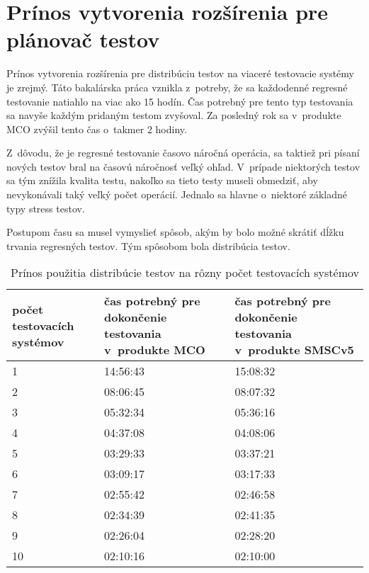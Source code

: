 \section{Prínos vytvorenia rozšírenia pre plánovač testov}
\label{sekcia:prinos_pouzitia}
Prínos vytvorenia rozšírenia pre distribúciu testov na viaceré testovacie 
systémy je zrejmý. Táto bakalárska práca vznikla z~potreby, že sa každodenné
regresné testovanie natiahlo na viac ako 15 hodín. Čas potrebný pre tento
typ testovania sa navyše každým pridaným testom zvyšoval. 
Za posledný rok sa v~produkte MCO zvýšil tento čas o~takmer 2 hodiny.

Z~dôvodu, že je regresné testovanie časovo náročná operácia, sa taktiež 
pri písaní nových testov bral na časovú náročnosť veľký ohľad.
V~prípade niektorých testov sa tým znížila kvalita testu, nakoľko sa tieto
testy museli obmedziť, aby nevykonávali taký veľký počet operácií.
Jednalo sa hlavne o~niektoré základné typy stress testov.

Postupom času sa musel vymyslieť spôsob, akým by bolo možné skrátiť 
dĺžku trvania regresných testov. Tým spôsobom bola distribúcia testov.

\begin{table}
  \begin{center}
    \begin{tabular}{ | p{2cm} | p{5.3cm} | p{5.3cm} | }
      \hline
      \nohyphens{počet testovacích systémov} & 
      čas potrebný pre dokončenie testovania v~produkte MCO & 
      čas potrebný pre dokončenie testovania v~produkte \nohyphens{SMSCv5} \\ \hline
      1  & 14:56:43 & 15:08:32 \\ \hline
      2  & 08:06:45 & 08:07:32 \\ \hline 
      3  & 05:32:34 & 05:36:16 \\ \hline  
      4  & 04:37:08 & 04:08:06 \\ \hline
      5  & 03:29:33 & 03:37:21 \\ \hline
      6  & 03:09:17 & 03:17:33 \\ \hline
      7  & 02:55:42 & 02:46:58 \\ \hline
      8  & 02:34:39 & 02:41:35 \\ \hline
      9  & 02:26:04 & 02:28:20 \\ \hline
      10 & 02:10:16 & 02:10:00 \\ \hline
    \end{tabular}
    \caption{Prínos použitia distribúcie testov na rôzny počet 
             testovacích systémov}
    \label{tabulka:prinos_pouzitia_distribucie}
  \end{center}
\end{table}

